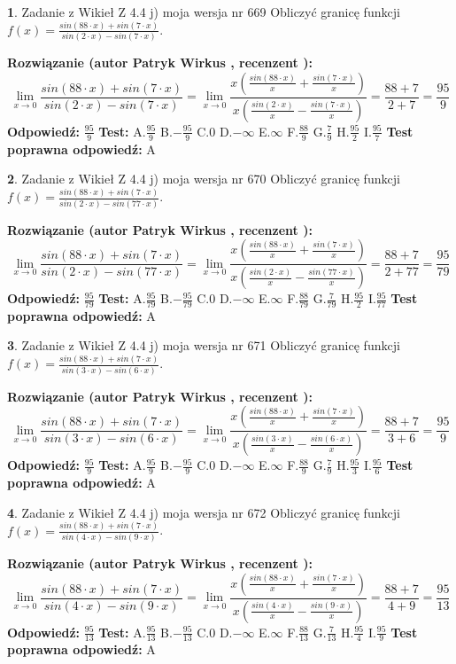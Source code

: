 \documentclass[12pt, a4paper]{article}
\theoremstyle{definition} %
\newtheorem{zad}{}
\newcommand{\zadStart}[1]{\begin{zad}#1\newline}
\newcommand{\zadStop}{\end{zad}}
\newcommand{\rozwStart}[2]{\noindent \textbf{Rozwiązanie (autor #1 , recenzent #2): }\newline}
\newcommand{\rozwStop}{\newline}
\newcommand{\odpStart}{\noindent \textbf{Odpowiedź:}\newline}
\newcommand{\odpStop}{\newline}
\newcommand{\testStart}{\noindent \textbf{Test:}\newline}
\newcommand{\testStop}{\newline}
\newcommand{\kluczStart}{\noindent \textbf{Test poprawna odpowiedź:}\newline}
\newcommand{\kluczStop}{\newline}
\begin{document}
\zadStart{Zadanie z Wikieł Z 4.4 j) moja wersja nr 669}
Obliczyć granicę funkcji $f(x)=\frac{sin(88\cdot x) +sin(7\cdot x)}{sin(2\cdot x) -sin(7\cdot x)}$.
\zadStop
\rozwStart{Patryk Wirkus}{}
$$\lim\limits_{x\to 0}\frac{sin(88\cdot x) +sin(7\cdot x)}{sin(2\cdot x) -sin(7\cdot x)}=\lim\limits_{x\to 0}\frac{x(\frac{sin(88\cdot x)}{x}+\frac{sin(7\cdot x)}{x})}{x(\frac{sin(2\cdot x)}{x}-\frac{sin(7\cdot x)}{x})}=\frac{88+7}{2+7} = \frac{95}{9}$$
\rozwStop
\odpStart
$\frac{95}{9}$
\odpStop
\testStart
A.$\frac{95}{9}$
B.$-\frac{95}{9}$
C.$0$
D.$-\infty$
E.$\infty$
F.$\frac{88}{9}$
G.$\frac{7}{9}$
H.$\frac{95}{2}$
I.$\frac{95}{7}$
\testStop
\kluczStart
A
\kluczStop



\zadStart{Zadanie z Wikieł Z 4.4 j) moja wersja nr 670}
Obliczyć granicę funkcji $f(x)=\frac{sin(88\cdot x) +sin(7\cdot x)}{sin(2\cdot x) -sin(77\cdot x)}$.
\zadStop
\rozwStart{Patryk Wirkus}{}
$$\lim\limits_{x\to 0}\frac{sin(88\cdot x) +sin(7\cdot x)}{sin(2\cdot x) -sin(77\cdot x)}=\lim\limits_{x\to 0}\frac{x(\frac{sin(88\cdot x)}{x}+\frac{sin(7\cdot x)}{x})}{x(\frac{sin(2\cdot x)}{x}-\frac{sin(77\cdot x)}{x})}=\frac{88+7}{2+77} = \frac{95}{79}$$
\rozwStop
\odpStart
$\frac{95}{79}$
\odpStop
\testStart
A.$\frac{95}{79}$
B.$-\frac{95}{79}$
C.$0$
D.$-\infty$
E.$\infty$
F.$\frac{88}{79}$
G.$\frac{7}{79}$
H.$\frac{95}{2}$
I.$\frac{95}{77}$
\testStop
\kluczStart
A
\kluczStop



\zadStart{Zadanie z Wikieł Z 4.4 j) moja wersja nr 671}
Obliczyć granicę funkcji $f(x)=\frac{sin(88\cdot x) +sin(7\cdot x)}{sin(3\cdot x) -sin(6\cdot x)}$.
\zadStop
\rozwStart{Patryk Wirkus}{}
$$\lim\limits_{x\to 0}\frac{sin(88\cdot x) +sin(7\cdot x)}{sin(3\cdot x) -sin(6\cdot x)}=\lim\limits_{x\to 0}\frac{x(\frac{sin(88\cdot x)}{x}+\frac{sin(7\cdot x)}{x})}{x(\frac{sin(3\cdot x)}{x}-\frac{sin(6\cdot x)}{x})}=\frac{88+7}{3+6} = \frac{95}{9}$$
\rozwStop
\odpStart
$\frac{95}{9}$
\odpStop
\testStart
A.$\frac{95}{9}$
B.$-\frac{95}{9}$
C.$0$
D.$-\infty$
E.$\infty$
F.$\frac{88}{9}$
G.$\frac{7}{9}$
H.$\frac{95}{3}$
I.$\frac{95}{6}$
\testStop
\kluczStart
A
\kluczStop



\zadStart{Zadanie z Wikieł Z 4.4 j) moja wersja nr 672}
Obliczyć granicę funkcji $f(x)=\frac{sin(88\cdot x) +sin(7\cdot x)}{sin(4\cdot x) -sin(9\cdot x)}$.
\zadStop
\rozwStart{Patryk Wirkus}{}
$$\lim\limits_{x\to 0}\frac{sin(88\cdot x) +sin(7\cdot x)}{sin(4\cdot x) -sin(9\cdot x)}=\lim\limits_{x\to 0}\frac{x(\frac{sin(88\cdot x)}{x}+\frac{sin(7\cdot x)}{x})}{x(\frac{sin(4\cdot x)}{x}-\frac{sin(9\cdot x)}{x})}=\frac{88+7}{4+9} = \frac{95}{13}$$
\rozwStop
\odpStart
$\frac{95}{13}$
\odpStop
\testStart
A.$\frac{95}{13}$
B.$-\frac{95}{13}$
C.$0$
D.$-\infty$
E.$\infty$
F.$\frac{88}{13}$
G.$\frac{7}{13}$
H.$\frac{95}{4}$
I.$\frac{95}{9}$
\testStop
\kluczStart
A
\kluczStop
\end{document}
